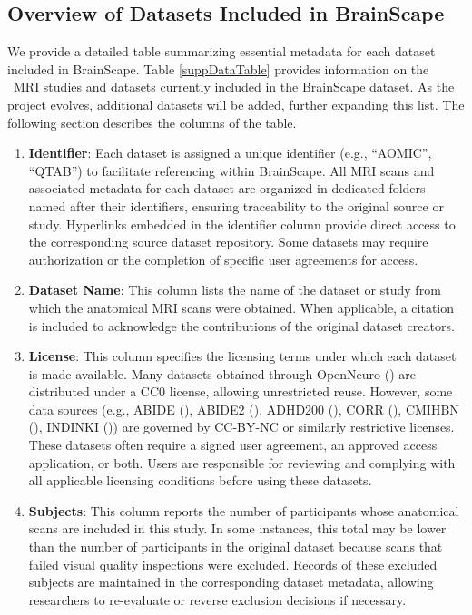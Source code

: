 \subsection{Overview of Datasets Included in BrainScape}

We provide a detailed table summarizing essential metadata for each dataset included in BrainScape. 
Table \ref{suppDataTable} provides information on the \NumDatasets\ MRI studies and datasets currently included in the BrainScape dataset.
As the project evolves, additional datasets will be added, further expanding this list. 
The following section describes the columns of the table.

\begin{enumerate}
    \item \textbf{Identifier}: Each dataset is assigned a unique identifier (e.g., ``AOMIC'', ``QTAB'') to facilitate referencing within BrainScape. 
    All MRI scans and associated metadata for each dataset are organized in dedicated folders named after their identifiers, ensuring traceability to the original source or study. 
    Hyperlinks embedded in the identifier column provide direct access to the corresponding source dataset repository.
    Some datasets may require authorization or the completion of specific user agreements for access.

    \item \textbf{Dataset Name}: This column lists the name of the dataset or study from which the anatomical MRI scans were obtained. 
    When applicable, a citation is included to acknowledge the contributions of the original dataset creators.

    \item \textbf{License}: This column specifies the licensing terms under which each dataset is made available. 
    Many datasets obtained through OpenNeuro (\cite{markiewicz2021openneuro}) are distributed under a CC0 license, allowing unrestricted reuse.
    However, some data sources (e.g., ABIDE (\cite{di2014autism}), ABIDE2 (\cite{di2017enhancing}), ADHD200 (\cite{adhd2012adhd}), CORR (\cite{zuo2014open}), CMIHBN (\cite{alexander2017open}), INDINKI (\cite{nooner2012nki})) are governed by CC-BY-NC or similarly restrictive licenses. 
    These datasets often require a signed user agreement, an approved access application, or both. 
    Users are responsible for reviewing and complying with all applicable licensing conditions before using these datasets. 
    
    \item \textbf{Subjects}:  This column reports the number of participants whose anatomical scans are included in this study.
    In some instances, this total may be lower than the number of participants in the original dataset because scans that failed visual quality inspections were excluded. 
    Records of these excluded subjects are maintained in the corresponding dataset metadata, allowing researchers to re-evaluate or reverse exclusion decisions if necessary.


\end{enumerate}
